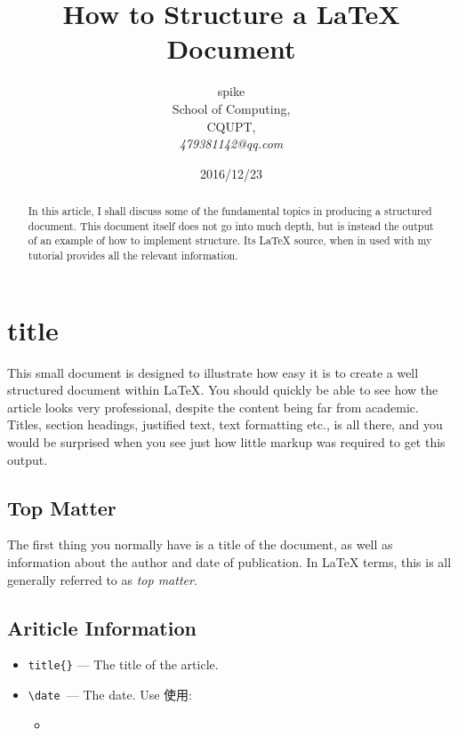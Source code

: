 \documentclass{article}
\begin{document}
\title{How to Structure a \LaTeX{} Document}
\author{spike \\
  School of Computing, \\
  CQUPT,\\
  \emph{479381142@qq.com}}
\date{2016/12/23}
\maketitle{}
\begin{abstract}
  In this article, I shall discuss some of the fundamental topics in
  producing a structured document.  This document itself does not go into
  much depth, but is instead the output of an example of how to implement
  structure. Its \LaTeX{} source, when in used with my tutorial
  provides all the relevant information.
\end{abstract}

\section{title}
\label{sec:introduction}

  This small document is designed to illustrate how easy it is to create a well structured
  document within \LaTeX\cite{lamport94}.  You should quickly be able to see how the article
  looks very professional, despite the content being far from academic.  Titles, section
  headings, justified text, text formatting etc., is all there, and you would be surprised
 when you see just how little markup was required to get this output.

\subsection{Top Matter}
\label{sec:top-matter}

 The first thing you normally have is a title of the document, as well as
 information about the author and date of publication.  In \LaTeX{} terms,
 this is all generally referred to as \emph{top matter}.

\subsection{Ariticle Information}
\label{sec:article-information}

\begin{itemize}
\item \verb|title{}| --- The title of the article.
\item \verb|\date |--- The date. Use 使用:
  \begin{itemize}
  \item 
  \end{itemize}
\end{itemize}
\end{document}
